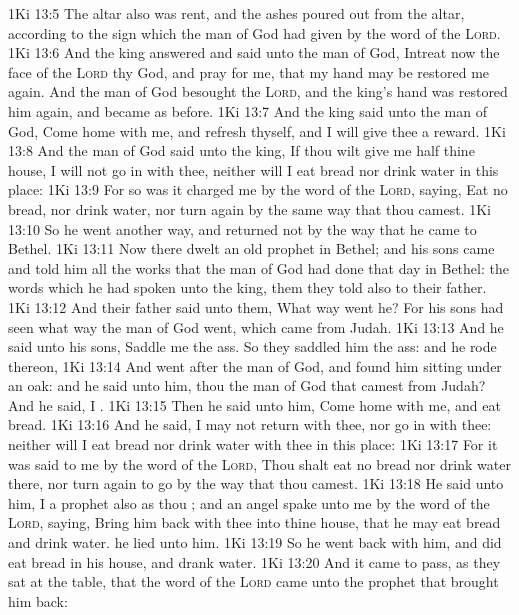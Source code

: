 \vs 1Ki 13:5 The altar also was rent, and the ashes poured out from the altar, according to the sign which the man of God had given by the word of the \textsc{Lord}.
\vs 1Ki 13:6 And the king answered and said unto the man of God, Intreat now the face of the \textsc{Lord} thy God, and pray for me, that my hand may be restored me again. And the man of God besought the \textsc{Lord}, and the king's hand was restored him again, and became as  before.
\vs 1Ki 13:7 And the king said unto the man of God, Come home with me, and refresh thyself, and I will give thee a reward.
\vs 1Ki 13:8 And the man of God said unto the king, If thou wilt give me half thine house, I will not go in with thee, neither will I eat bread nor drink water in this place:
\vs 1Ki 13:9 For so was it charged me by the word of the \textsc{Lord}, saying, Eat no bread, nor drink water, nor turn again by the same way that thou camest.
\vs 1Ki 13:10 So he went another way, and returned not by the way that he came to Bethel.
\vs 1Ki 13:11 Now there dwelt an old prophet in Bethel; and his sons came and told him all the works that the man of God had done that day in Bethel: the words which he had spoken unto the king, them they told also to their father.
\vs 1Ki 13:12 And their father said unto them, What way went he? For his sons had seen what way the man of God went, which came from Judah.
\vs 1Ki 13:13 And he said unto his sons, Saddle me the ass. So they saddled him the ass: and he rode thereon,
\vs 1Ki 13:14 And went after the man of God, and found him sitting under an oak: and he said unto him,  thou the man of God that camest from Judah? And he said, I .
\vs 1Ki 13:15 Then he said unto him, Come home with me, and eat bread.
\vs 1Ki 13:16 And he said, I may not return with thee, nor go in with thee: neither will I eat bread nor drink water with thee in this place:
\vs 1Ki 13:17 For it was said to me by the word of the \textsc{Lord}, Thou shalt eat no bread nor drink water there, nor turn again to go by the way that thou camest.
\vs 1Ki 13:18 He said unto him, I  a prophet also as thou ; and an angel spake unto me by the word of the \textsc{Lord}, saying, Bring him back with thee into thine house, that he may eat bread and drink water.  he lied unto him.
\vs 1Ki 13:19 So he went back with him, and did eat bread in his house, and drank water.
\vs 1Ki 13:20 And it came to pass, as they sat at the table, that the word of the \textsc{Lord} came unto the prophet that brought him back:
